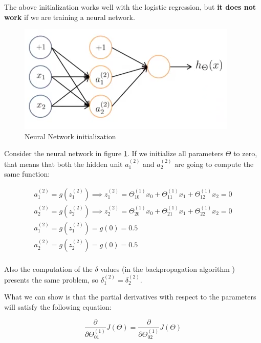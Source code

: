 The above initialization works well with the logistic regression, but {\bf it does not work} if we are training a neural network. 

\begin{figure}[H]
\begin{center}
\includegraphics[scale=0.35]{images/nninitialization}
\end{center}
\caption{Neural Network initialization } 
\label{fig:nninitialization}
\end{figure}
 
Consider the neural network in figure \ref{fig:nninitialization}. If we initialize all parameters $\Theta$ to zero, that means that both the hidden unit $a_1^{(2)}$ and $a_2^{(2)}$ are going to compute the same function:



\begin{equation}\label{eq:hid}
\begin{aligned}
a_1^{(2)}  = g(z_1^{(2)}) \implies z_1^{(2)} = \Theta_{10}^{(1)}x_0 + \Theta_{11}^{(1)}x_1 +  \Theta_{12}^{(1)}x_2  = 0\\
a_2^{(2)}  = g(z_2^{(2)}) \implies z_2^{(2)} = \Theta_{20}^{(1)}x_0 + \Theta_{21}^{(1)}x_1 +  \Theta_{22}^{(1)}x_2  = 0\\
a_1^{(2)}  = g(z_1^{(2)}) = g(0) = 0.5\\
a_2^{(2)}  = g(z_2^{(2)}) = g(0) = 0.5\\
\end{aligned}
\end{equation}

Also the computation of the $\delta$ values (in the backpropagation algorithm ) presents the same problem, so  $\delta_1^{(2)} = \delta_2^{(2)}$.

What we can show is that the partial derivatives with respect to the parameters will satisfy the following equation:

\begin{equation}\label{eq:initpartderiv}
\frac{\partial}{\partial \Theta_{01}^{(1)}} J(\Theta) = \frac{\partial}{\partial \Theta_{02}^{(1)}} J(\Theta)
\end{equation}


